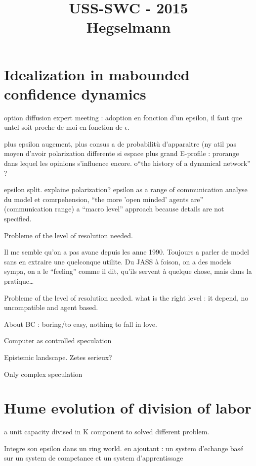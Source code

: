 \documentclass[a4paper]{article}
\title{USS-SWC - 2015\\
Hegselmann}
\begin{document}
\section{Idealization in mabounded confidence dynamics}
option diffusion expert meeting : adoption en fonction d'un epsilon, il faut que untel soit proche de moi en fonction de $\epsilon$.

plus epsilon augement, plus consus a de probabilitù d'apparaitre (ny atil pas moyen d'avoir polarization differente si espace plus grand
E-profile : prorange dans lequel les opinions s'influence encore.
o``the history of a dynamical network'' ?

epsilon split.  explaine polarization? epsilon as a range of communication
analyse du model et comrpehension, ``the more 'open minded' agents are'' (communication range)
 a ``macro level'' approach because details are not specified.

 Probleme of the level of resolution needed.

 Il me semble qu'on a pas avanc depuis les anne 1990. Toujours a parler de model sans en extraire une quelconque utilite. Du JASS à foison,  on a des models sympa, on a le ``feeling'' comme il dit, qu'ils servent à quelque chose, mais dans la pratique\ldots

 Probleme of the level of resolution needed.
 what is the right level : it depend, no uncompatible and agent based.


 About BC : boring/to easy, nothing to fall in love.


 Computer as controlled speculation


 Epistemic landscape. Zetes serieux?


 Only complex speculation
 \section{Hume evolution of division of labor}

 a unit capacity divised in K component to solved different problem.
 

 Integre son epsilon dans un ring world. en ajoutant : un system d'echange basé sur un system de competance et un system d'apprentissage
\end{document}
